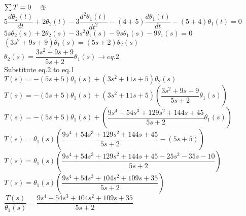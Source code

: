 \documentclass[11pt,letterpaper]{article}
\begin{document}
\begin{center}

        $\sum T = 0 \quad \circlearrowright \hspace{-0.8em} $+$  $ \\

        $5\dfrac{d\theta_2(t)}{dt}+2\theta_2(t)-3\dfrac{d^2\theta_1(t)}{dt^2}-(4+5)\dfrac{d\theta_1(t)}{dt}-(5+4)\theta_1(t)=0$\\

        $5s\theta_2(s)+2\theta_2(s)-3s^2\theta_1(s)-9s\theta_1(s)-9\theta_1(s)=0$\\

        $(3s^2+9s+9)\theta_1(s)=(5s+2)\theta_2(s)$\\

        $\theta_2(s)=\dfrac{3s^2+9s+9}{5s+2}\theta_1(s)  \rightarrow eq.2$\\

        Substitute eq.2 to eq.1\\

        $T(s)=-(5s+5)\theta_1(s)+(3s^2+11s+5)\theta_2(s)$\\

        $T(s)=-(5s+5)\theta_1(s)+(3s^2+11s+5)\left(\dfrac{3s^2+9s+9}{5s+2}\theta_1(s)\right)$\\

        $T(s)=-(5s+5)\theta_1(s)+\left(\dfrac{9s^4+54s^3+129s^2+144s+45}{5s+2}\theta_1(s)\right)$\\

        $T(s)=\theta_1(s)\left(\dfrac{9s^4+54s^3+129s^2+144s+45}{5s+2}-(5s+5)\right)$\\

        $T(s)=\theta_1(s)\left(\dfrac{9s^4+54s^3+129s^2+144s+45-25s^2-35s-10}{5s+2}\right)$\\

        $T(s)=\theta_1(s)\left(\dfrac{9s^4+54s^3+104s^2+109s+35}{5s+2}\right)$\\

        $\dfrac{T(s)}{\theta_1(s)}=\dfrac{9s^4+54s^3+104s^2+109s+35}{5s+2}$\\




\end{center}       
\clearpage
\end{document}
